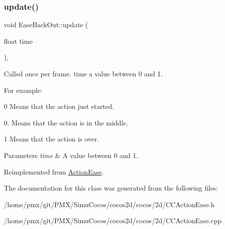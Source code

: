 \mbox{\label{classEaseBackOut_a458a06e1b120e51c52a4687ced84f757}} 
\subsubsection{\texorpdfstring{update()}{update()}}
{\footnotesize\ttfamily void Ease\+Back\+Out\+::update (\begin{DoxyParamCaption}\item[{float}]{time }\end{DoxyParamCaption})\hspace{0.3cm}{\ttfamily [override]}, {\ttfamily [virtual]}}

Called once per frame. time a value between 0 and 1.

For example\+:
\begin{DoxyItemize}
\item 0 Means that the action just started.
\item 0. Means that the action is in the middle.
\item 1 Means that the action is over.
\end{DoxyItemize}


\begin{DoxyParams}{Parameters}
{\em time} & A value between 0 and 1. \\
\hline
\end{DoxyParams}


Reimplemented from \hyperlink{classActionEase_a77679f09c02cf75fb54776470c339fc5}{Action\+Ease}.



The documentation for this class was generated from the following files\+:\begin{DoxyCompactItemize}
\item 
/home/pmx/git/\+P\+M\+X/\+Simu\+Cocos/cocos2d/cocos/2d/C\+C\+Action\+Ease.\+h\item 
/home/pmx/git/\+P\+M\+X/\+Simu\+Cocos/cocos2d/cocos/2d/C\+C\+Action\+Ease.\+cpp\end{DoxyCompactItemize}
